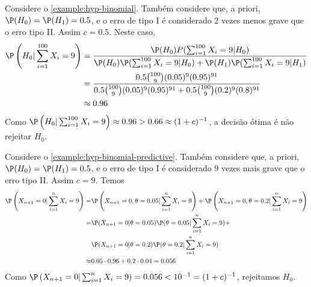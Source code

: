 \begin{example}
 \label{example:hyp-binomial-2}
 Considere o \cref{example:hyp-binomial}. 
 Também considere que, a priori,
 $\P(H_{0})=\P(H_{1})=0.5$,
 e o erro de tipo I é considerado $2$ vezes 
 menos grave que o erro tipo II. Assim $c=0.5$.
 Neste caso,
 \begin{align*}
  \P\left(H_{0}|\sum_{i=1}^{100}{X_i}=9\right)
  &= \frac{\P(H_{0})P(\sum_{i=1}^{100}{X_i}=9|H_{0})}
  {\P(H_{0})\P(\sum_{i=1}^{100}{X_i}=9|H_{0})
  +\P(H_{1})\P(\sum_{i=1}^{100}{X_i}=9|H_{1})} \\
  &= \frac{0.5 {100 \choose 9}(0.05)^{9}(0.95)^{91}}{0.5 {100 \choose 9}(0.05)^{9}(0.95)^{91} + 0.5 {100 \choose 9}(0.2)^{9}(0.8)^{91}} \\
  &\approx 0.96
 \end{align*}
 Como $\P\left(H_{0}|\sum_{i=1}^{100}{X_i}=9\right) \approx 0.96 > 0.66 \approx (1+c)^{-1}$,
 a decisão ótima é não rejeitar $H_{0}$.
\end{example}

\begin{example}
 Considere o \cref{example:hyp-binomial-predictive}. 
 Também considere que, a priori, 
 $\P(H_{0})=\P(H_{1})=0.5$,
 e o erro de tipo I é considerado $9$ vezes 
 mais grave que o erro tipo II. Assim $c=9$.
 Temos
 \begin{align*}
  \P\left(X_{n+1}=0|\sum_{i=1}^{n}{X_{i}}=9\right)
  =& \P\left(X_{n+1}=0,\theta=0.05|\sum_{i=1}^{n}{X_{i}}=9\right)
  +\P\left(X_{n+1}=0,\theta=0.2|\sum_{i=1}^{n}{X_{i}}=9\right) \\
  =& \P(X_{n+1}=0|\theta=0.05)
  \P(\theta=0.05|\sum_{i=1}^{n}{X_{i}}=9)+\\
  & \P(X_{n+1}=0|\theta=0.2)
  \P(\theta=0.2|\sum_{i=1}^{n}{X_{i}}=9) \\
  \approx& 0.05 \cdot 0.96 + 0.2 \cdot 0.04 = 0.056
 \end{align*}
 Como $\P\left(X_{n+1}=0|\sum_{i=1}^{n}{X_{i}}=9\right) = 0.056 < 10^{-1} = (1+c)^{-1}$,
 rejeitamos $H_{0}$.
\end{example}

